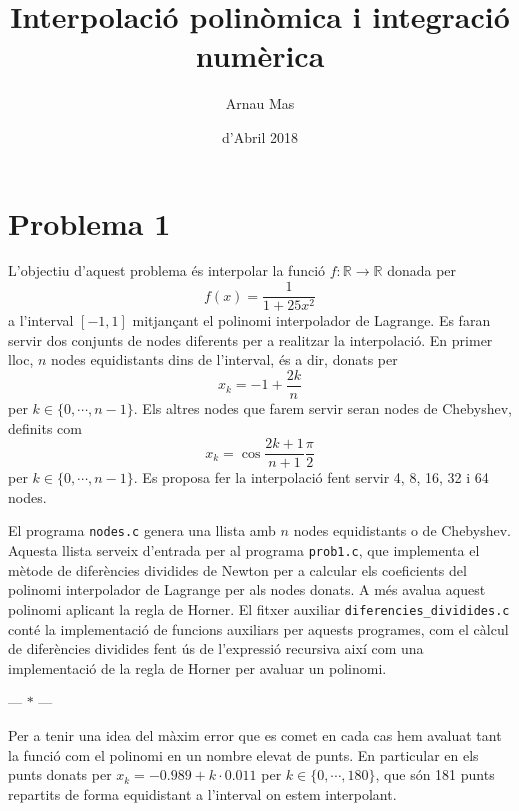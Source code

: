 \documentclass[12pt]{article}
\title{\sffamily {\bfseries Pràctica 3:} Interpolació polinòmica i integració numèrica}
\author{\sffamily Arnau Mas}
\date{\sffamily 24 d'Abril 2018}
\newcommand{\R}{\mathbb{R}}
\newcommand{\parbreak}{
	\begin{center}
		--- $\ast$ ---
	\end{center} 
}
\begin{document}
\maketitle

\section{Problema 1}
L'objectiu d'aquest problema és interpolar la funció \( f \colon \R \to \R \) donada per
\begin{equation*}
	f(x) = \frac{1}{1 + 25x^2}
\end{equation*}
a l'interval \( [-1,1] \) mitjançant el polinomi interpolador de Lagrange. Es faran servir dos conjunts de nodes diferents per a realitzar la interpolació. En primer lloc, \( n \) nodes equidistants dins de l'interval, és a dir, donats per
\begin{equation*}
x_k = -1 + \frac{2k}{n}
\end{equation*}
per \( k \in \{0, \cdots, n-1\} \). Els altres nodes que farem servir seran nodes de Chebyshev, definits com
\begin{equation*}
x_k = \cos{\frac{2k+1}{n+1} \frac{\pi}{2}}
\end{equation*}
per \( k \in \{0, \cdots, n-1\} \). Es proposa fer la interpolació fent servir 4, 8, 16, 32 i 64 nodes. 

El programa \texttt{nodes.c} genera una llista amb \( n \) nodes equidistants o de Chebyshev. Aquesta llista serveix d'entrada per al programa \texttt{prob1.c}, que implementa el mètode de diferències dividides de Newton per a calcular els coeficients del polinomi interpolador de Lagrange per als nodes donats. A més avalua aquest polinomi aplicant la regla de Horner. El fitxer auxiliar \texttt{diferencies\_dividides.c} conté la implementació de funcions auxiliars per aquests programes, com el càlcul de diferències dividides fent ús de l'expressió recursiva així com una implementació de la regla de Horner per avaluar un polinomi. 

\parbreak

Per a tenir una idea del màxim error que es comet en cada cas hem avaluat tant la funció com el polinomi en un nombre elevat de punts. En particular en els punts donats per \( x_k = \num{-0.989} + k \cdot \num{0.011} \) per \( k \in \{0, \cdots, 180\} \), que són 181 punts repartits de forma equidistant a l'interval on estem interpolant.  

\begin{figure}[htb]
\centering


\end{figure}
\end{document}
